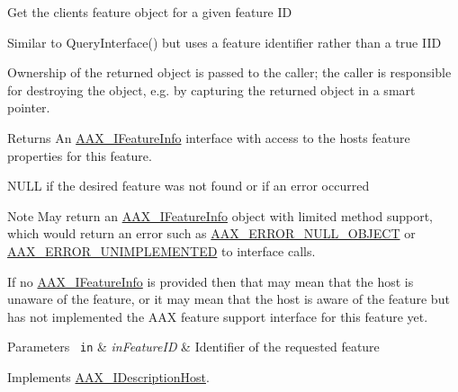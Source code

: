 Get the client\textquotesingle{}s feature object for a given feature ID

Similar to {\ttfamily Query\+Interface()} but uses a feature identifier rather than a true I\+ID

Ownership of the returned object is passed to the caller; the caller is responsible for destroying the object, e.\+g. by capturing the returned object in a smart pointer.


\begin{DoxyCode}{0}
\DoxyCodeLine{\textcolor{comment}{// AAX\_IDescriptionHost* descHost}}
\end{DoxyCode}


\begin{DoxyReturn}{Returns}
An \mbox{\hyperlink{a01829}{A\+A\+X\+\_\+\+I\+Feature\+Info}} interface with access to the host\textquotesingle{}s feature properties for this feature. 

{\ttfamily N\+U\+LL} if the desired feature was not found or if an error occurred
\end{DoxyReturn}
\begin{DoxyNote}{Note}
May return an \mbox{\hyperlink{a01829}{A\+A\+X\+\_\+\+I\+Feature\+Info}} object with limited method support, which would return an error such as \mbox{\hyperlink{a00494_a5f8c7439f3a706c4f8315a9609811937a647cce13fa531e3a46c6eab694048a9c}{A\+A\+X\+\_\+\+E\+R\+R\+O\+R\+\_\+\+N\+U\+L\+L\+\_\+\+O\+B\+J\+E\+CT}} or \mbox{\hyperlink{a00494_a5f8c7439f3a706c4f8315a9609811937a3b76994b32b97fcd56b19ef8032245df}{A\+A\+X\+\_\+\+E\+R\+R\+O\+R\+\_\+\+U\+N\+I\+M\+P\+L\+E\+M\+E\+N\+T\+ED}} to interface calls.

If no \mbox{\hyperlink{a01829}{A\+A\+X\+\_\+\+I\+Feature\+Info}} is provided then that may mean that the host is unaware of the feature, or it may mean that the host is aware of the feature but has not implemented the A\+AX feature support interface for this feature yet.
\end{DoxyNote}

\begin{DoxyParams}[1]{Parameters}
\mbox{\texttt{ in}}  & {\em in\+Feature\+ID} & Identifier of the requested feature \\
\hline
\end{DoxyParams}


Implements \mbox{\hyperlink{a01793_aa0d9e27d0207113f98c217d870bfa5e9}{A\+A\+X\+\_\+\+I\+Description\+Host}}.

